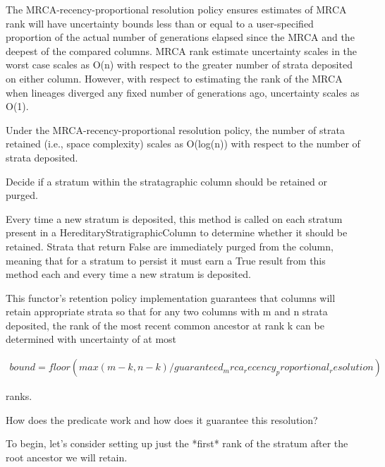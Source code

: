 The MRCA-recency-proportional resolution policy ensures estimates of MRCA
rank will have uncertainty bounds less than or equal to a user-specified
proportion of the actual number of generations elapsed since the MRCA and
the deepest of the compared columns. MRCA rank estimate uncertainty scales
in the worst case scales as O(n) with respect to the greater number of
strata deposited on either column. However, with respect to estimating the rank of the MRCA when lineages diverged any fixed number of generations ago,
uncertainty scales as O(1).

Under the MRCA-recency-proportional resolution policy, the number of strata
retained (i.e., space complexity) scales as O(log(n)) with respect to the
number of strata deposited.

Decide if a stratum within the stratagraphic column should be
retained or purged.

Every time a new stratum is deposited, this method is called on each
stratum present in a HereditaryStratigraphicColumn to determine whether
it should be retained. Strata that return False are immediately purged
from the column, meaning that for a stratum to persist it must earn a
True result from this method each and every time a new stratum is
deposited.

This functor's retention policy implementation guarantees that columns
will retain appropriate strata so that for any two columns with m and n
strata deposited, the rank of the most recent common ancestor at rank k
can be determined with uncertainty of at most

\begin{align*}
    bound = floor(
        max(m - k, n - k)
        / guaranteed_mrca_recency_proportional_resolution
    )
\end{align*}

ranks.

How does the predicate work and how does it guarantee this resolution?

To begin, let's consider setting up just the *first* rank of the
stratum after the root ancestor we will retain.



